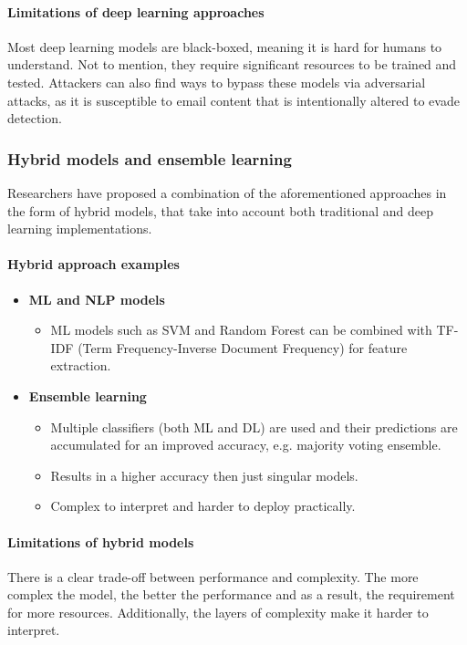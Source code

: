 \paragraph{Limitations of deep learning approaches}
Most deep learning models are black-boxed, meaning it is hard for humans to understand. Not to mention, they require significant resources to be trained and tested. Attackers can also find ways to bypass these models via adversarial attacks, as it is susceptible to email content that is intentionally altered to evade detection.

\subsubsection*{Hybrid models and ensemble learning}
Researchers have proposed a combination of the aforementioned approaches in the form of hybrid models, that take into account both traditional and deep learning implementations.

\paragraph{Hybrid approach examples}
\begin{itemize}
    \item \textbf{ML and NLP models}
    \begin{itemize}
        \item ML models such as SVM and Random Forest can be combined with TF-IDF (Term Frequency-Inverse Document Frequency) for feature extraction.
    \end{itemize}
    \item \textbf{Ensemble learning}
    \begin{itemize}
        \item Multiple classifiers (both ML and DL) are used and their predictions are accumulated for an improved accuracy, e.g. majority voting ensemble.
        \item Results in a higher accuracy then just singular models.
        \item Complex to interpret and harder to deploy practically.
    \end{itemize}
\end{itemize}

\paragraph{Limitations of hybrid models}
There is a clear trade-off between performance and complexity. The more complex the model, the better the performance and as a result, the requirement for more resources. Additionally, the layers of complexity make it harder to interpret.

